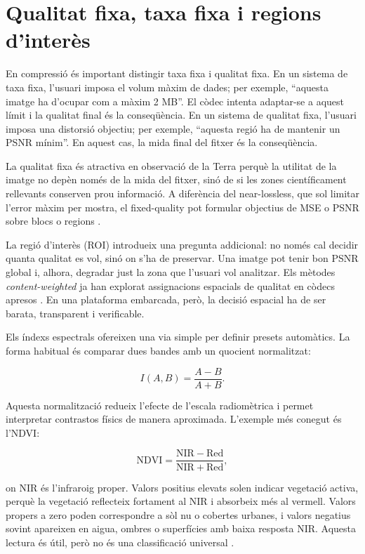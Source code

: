 \section{Qualitat fixa, taxa fixa i regions d'interès}\label{sec:fixed_quality_art}

En compressió és important distingir taxa fixa i qualitat fixa. En un sistema
de taxa fixa, l'usuari imposa el volum màxim de dades; per exemple, ``aquesta
imatge ha d'ocupar com a màxim 2 MB''. El còdec intenta adaptar-se a aquest
límit i la qualitat final és la conseqüència. En un sistema de qualitat fixa,
l'usuari imposa una distorsió objectiu; per exemple, ``aquesta regió ha de
mantenir un PSNR mínim''. En aquest cas, la mida final del fitxer és la
conseqüència.

La qualitat fixa és atractiva en observació de la Terra perquè la utilitat de
la imatge no depèn només de la mida del fitxer, sinó de si les zones
científicament rellevants conserven prou informació. A diferència del
near-lossless, que sol limitar l'error màxim per mostra, el fixed-quality pot
formular objectius de MSE o PSNR sobre blocs o regions
\cite{mijares2024fixed}.

La regió d'interès (ROI) introdueix una pregunta addicional: no només cal
decidir quanta qualitat es vol, sinó on s'ha de preservar. Una imatge pot tenir
bon PSNR global i, alhora, degradar just la zona que l'usuari vol analitzar.
Els mètodes \emph{content-weighted} ja han explorat assignacions espacials de
qualitat en còdecs apresos \cite{li2018content}. En una plataforma embarcada,
però, la decisió espacial ha de ser barata, transparent i verificable.

Els índexs espectrals ofereixen una via simple per definir presets automàtics.
La forma habitual és comparar dues bandes amb un quocient normalitzat:

\begin{equation}
I(A,B)=\frac{A-B}{A+B}.
\label{eq:spectral_index_intro}
\end{equation}

Aquesta normalització redueix l'efecte de l'escala radiomètrica i permet
interpretar contrastos físics de manera aproximada. L'exemple més conegut és
l'NDVI:

\begin{equation}
\mathrm{NDVI}=\frac{\mathrm{NIR}-\mathrm{Red}}
{\mathrm{NIR}+\mathrm{Red}},
\end{equation}

on NIR és l'infraroig proper. Valors positius elevats solen indicar vegetació
activa, perquè la vegetació reflecteix fortament al NIR i absorbeix més al
vermell. Valors propers a zero poden correspondre a sòl nu o cobertes urbanes,
i valors negatius sovint apareixen en aigua, ombres o superfícies amb baixa
resposta NIR. Aquesta lectura és útil, però no és una classificació universal
\cite{rouse1974ndvi}.

